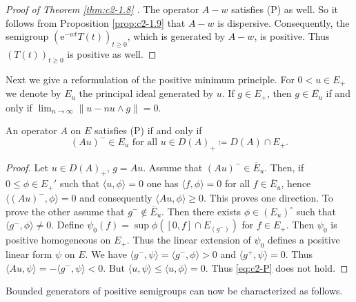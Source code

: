 \begin{proof}[Proof of Theorem \ref{thm:c2-1.8}  ]
The operator $A - w$ satisfies (P) 
as well.
So it follows from Proposition \ref{prop:c2-1.9}   that $A - w$ is dispersive.
Consequently, the semigroup $(\mathrm{e}^{-wt}T(t))_{t \geq 0}$, which is generated by $A - w$, is positive.
Thus $(T(t))_{t \geq 0}$ is positive as well.
\end{proof}
Next we give a reformulation of the positive minimum principle.
For $0 < u \in E_{+}$ we denote by $E_{u}$ the principal ideal generated by $u$.
If $g \in E_{+}$, then $g \in \overline{E_{u}}$ if and only if $\lim_{n \to \infty} \|u - n u \wedge g\| = 0$.
\begin{lemma}\label{lem:c2-1.10}
An operator $A$ on $E$ satisfies (P) if and only if
\begin{equation}\label{eq:c2-1.8}
(Au)^{-} \in E_{u} \text{ for all } u \in D(A)_{+} \coloneqq D(A) \cap E_{+}.
\end{equation}
\end{lemma}
\begin{proof}
Let $u \in D(A)_{+}$, $g = Au$.
Assume that $(Au)^{-} \in \overline{E}_{u}$.
Then, if $0 \leq \phi \in E_{+}'$ such that $\langle u,\phi \rangle = 0$ one has $\langle f,\phi \rangle = 0$ for all $f \in \overline{E}_{u}$, hence $\langle (Au)^{-},\phi \rangle = 0$ and consequently $\langle Au,\phi \rangle \geq 0$.
This proves one direction.
To prove the other assume that $g^{-} \not\in \overline{E}_{u}$.
Then there exists $\phi \in (E_{u})^{\circ}$ such that $\langle g^{-},\phi \rangle \not= 0$.
Define $\psi_{0}(f) = \sup \phi([0,f] \cap E_{(g^{-})})$ for $f \in E_{+}$.
Then $\psi_{0}$ is positive homogeneous on $E_{+}$.
Thus the linear extension of $\psi_{0}$ defines a positive linear form $\psi$ on $E$.
We have $\langle g^{-},\psi \rangle = \langle g^{-},\phi \rangle > 0$ and $\langle g^{+},\psi \rangle = 0$.
Thus $\langle Au,\psi \rangle = - \langle g^{-},\psi \rangle < 0$.
But $\langle u,\psi \rangle \leq \langle u,\phi \rangle = 0$.
Thus  \eqref{eq:c2-P}   does not hold.
\end{proof}
Bounded generators of positive semigroups can now be characterized as follows.
